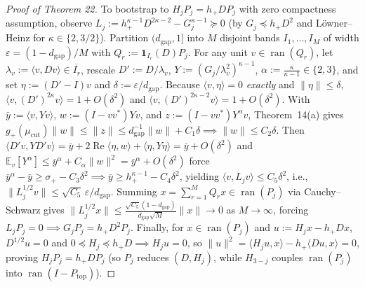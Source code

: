 \documentclass[10pt,letterpaper]{article}
\newcommand{\ran}{\operatorname{ran}}
\begin{document}
\begin{proof}[Proof of Theorem 22]
To bootstrap to $H_j P_j = h_+ D P_j$ with zero compactness assumption, observe $L_j := h_+^{\kappa-1} D^{2\kappa-2} - G_j^{\kappa-1} \succeq 0$ (by $G_j \preceq h_+ D^2$ and L\"owner--Heinz for $\kappa \in \{2, 3/2\}$). Partition $(d_{\mathrm{gap}}, 1]$ into $M$ disjoint bands $I_1,\dots,I_M$ of width $\varepsilon = (1-d_{\mathrm{gap}})/M$ with $Q_r := \mathbf{1}_{I_r}(D) P_j$. For any unit $v \in \ran(Q_r)$, let $\lambda_v := \langle v, Dv\rangle \in \overline{I_r}$, rescale $D' := D/\lambda_v$, $Y := (G_j/\lambda_v^2)^{\kappa-1}$, $\alpha := \frac{\kappa}{\kappa-1} \in \{2, 3\}$, and set $\eta := (D' - I)v$ and $\delta := \varepsilon/d_{\mathrm{gap}}$. Because $\langle v, \eta\rangle = 0$ \emph{exactly} and $\|\eta\| \le \delta$, $\langle v, (D')^{2\kappa} v\rangle = 1 + O(\delta^2)$ and $\langle v, (D')^{2\kappa-2} v\rangle = 1 + O(\delta^2)$. With $\bar{y} := \langle v, Y v\rangle$, $w := (I-vv^*)Yv$, and $z := (I-vv^*)Y^\alpha v$, Theorem~14(a) gives $g_+(\mu_{\mathrm{cut}})\|w\| \le \|z\| \le d_{\mathrm{gap}}^{-1}\|w\| + C_1\delta \implies \|w\| \le C_2\delta$. Then $\langle D'v, Y D'v\rangle = \bar{y} + 2\operatorname{Re}\langle \eta, w\rangle + \langle\eta, Y\eta\rangle = \bar{y} + O(\delta^2)$ and $\mathbb{E}_v[Y^\alpha] \le \bar{y}^\alpha + C_\alpha\|w\|^2 = \bar{y}^\alpha + O(\delta^2)$ force $\bar{y}^\alpha - \bar{y} \ge \sigma_+ - C_3\delta^2 \implies \bar{y} \ge h_+^{\kappa-1} - C_4\delta^2$, yielding $\langle v, L_j v\rangle \le C_5\delta^2$, i.e., $\|L_j^{1/2} v\| \le \sqrt{C_5}\,\varepsilon/d_{\mathrm{gap}}$. Summing $x = \sum_{r=1}^M Q_r x \in \ran(P_j)$ via Cauchy--Schwarz gives $\|L_j^{1/2} x\| \le \frac{\sqrt{C_5}(1-d_{\mathrm{gap}})}{d_{\mathrm{gap}}\sqrt{M}}\|x\| \to 0$ as $M \to \infty$, forcing $L_j P_j = 0 \implies G_j P_j = h_+ D^2 P_j$. Finally, for $x \in \ran(P_j)$ and $u := H_j x - h_+ D x$, $D^{1/2} u = 0$ and $0 \preceq H_j \preceq h_+ D \implies H_j u = 0$, so $\|u\|^2 = \langle H_j u, x\rangle - h_+\langle Du, x\rangle = 0$, proving $H_j P_j = h_+ D P_j$ (so $P_j$ reduces $(D, H_j)$, while $H_{3-j}$ couples $\ran(P_j)$ into $\ran(I - P_{\mathrm{top}})$).


\end{proof}
\end{document}
